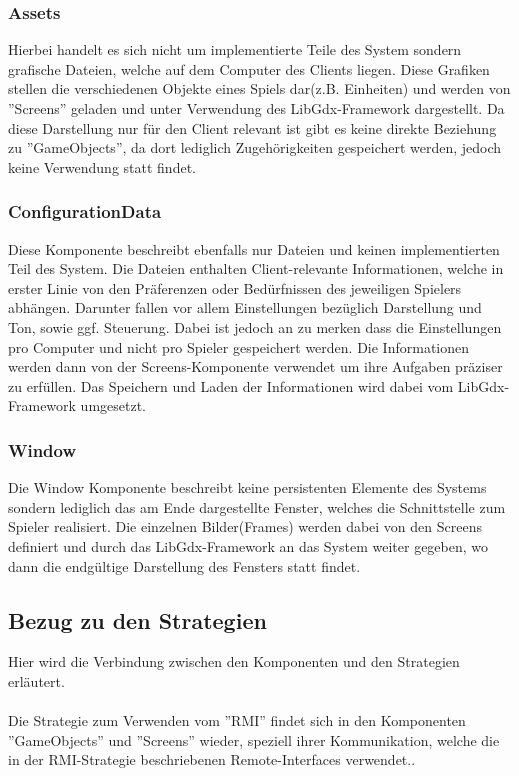 \documentclass[fontsize=12pt,paper=a4,twoside]{scrartcl}
\begin{document}
\subsubsection{Assets}
Hierbei handelt es sich nicht um implementierte Teile des System sondern grafische Dateien, welche auf dem Computer des Clients liegen. Diese Grafiken stellen die verschiedenen Objekte eines Spiels dar(z.B. Einheiten) und werden von ''Screens'' geladen und unter Verwendung des LibGdx-Framework dargestellt. Da diese Darstellung nur für den Client relevant ist gibt es keine direkte Beziehung zu ''GameObjects'', da dort lediglich Zugehörigkeiten gespeichert werden, jedoch keine Verwendung statt findet.

\subsubsection{ConfigurationData}
Diese Komponente beschreibt ebenfalls nur Dateien und keinen implementierten Teil des System. Die Dateien enthalten Client-relevante Informationen, welche in erster Linie von den Präferenzen oder Bedürfnissen des jeweiligen Spielers abhängen. Darunter fallen vor allem Einstellungen bezüglich Darstellung und Ton, sowie ggf. Steuerung. Dabei ist jedoch an zu merken dass die Einstellungen pro Computer und nicht pro Spieler gespeichert werden. Die Informationen werden dann von der Screens-Komponente verwendet um ihre Aufgaben präziser zu erfüllen. Das Speichern und Laden der Informationen wird dabei vom LibGdx-Framework umgesetzt.

\subsubsection{Window}

Die Window Komponente beschreibt keine persistenten Elemente des Systems sondern lediglich das am Ende dargestellte Fenster, welches die Schnittstelle zum Spieler realisiert. Die einzelnen Bilder(Frames) werden dabei von den Screens definiert und durch das LibGdx-Framework an das System  weiter gegeben, wo dann die endgültige Darstellung des Fensters statt findet.

\subsection{Bezug zu den Strategien}
Hier wird die Verbindung zwischen den Komponenten und den Strategien erläutert.\\\\
Die Strategie zum Verwenden vom ''RMI'' findet sich in den Komponenten ''GameObjects'' und ''Screens'' wieder, speziell ihrer Kommunikation, welche die in der RMI-Strategie beschriebenen Remote-Interfaces verwendet.. \\
\end{document}
